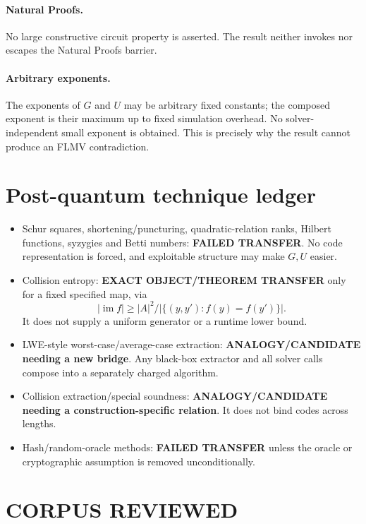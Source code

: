 \documentclass[11pt]{article}
\begin{document}
\paragraph{Natural Proofs.}
No large constructive circuit property is asserted.  The result neither
invokes nor escapes the Natural Proofs barrier.

\paragraph{Arbitrary exponents.}
The exponents of \(G\) and \(U\) may be arbitrary fixed constants; the
composed exponent is their maximum up to fixed simulation overhead.  No
solver-independent small exponent is obtained.  This is precisely why the
result cannot produce an FLMV contradiction.

\section{Post-quantum technique ledger}

\begin{itemize}
\item Schur squares, shortening/puncturing, quadratic-relation ranks, Hilbert
functions, syzygies and Betti numbers: \textbf{FAILED TRANSFER}.  No code
representation is forced, and exploitable structure may make \(G,U\) easier.
\item Collision entropy: \textbf{EXACT OBJECT/THEOREM TRANSFER} only for a
fixed specified map, via
\[
 |\operatorname{im}f|\ge
 |A|^2/|\{(y,y'):f(y)=f(y')\}|.
\]
It does not supply a uniform generator or a runtime lower bound.
\item LWE-style worst-case/average-case extraction:
\textbf{ANALOGY/CANDIDATE needing a new bridge}.  Any black-box extractor and
all solver calls compose into a separately charged algorithm.
\item Collision extraction/special soundness:
\textbf{ANALOGY/CANDIDATE needing a construction-specific relation}.  It does
not bind codes across lengths.
\item Hash/random-oracle methods: \textbf{FAILED TRANSFER} unless the oracle
or cryptographic assumption is removed unconditionally.
\end{itemize}

\section{CORPUS REVIEWED}
\end{document}
